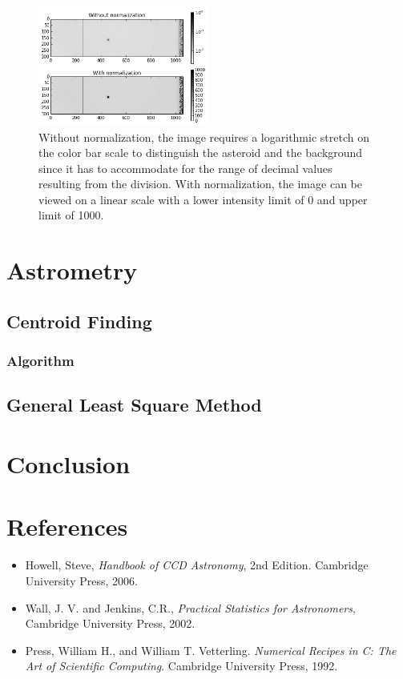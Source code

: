 \documentclass[authoryear, 12pt,5p, times]{elsarticle}
\begin{document}
	\begin{figure}[h!]
\includegraphics[width=0.5\textwidth]{figures/normalization}
\caption{Without normalization, the image requires a logarithmic stretch on the color bar scale to distinguish the asteroid and the background since it has to accommodate for the range of decimal values resulting from the division. With normalization, the image can be viewed on a linear scale with a lower intensity limit of 0 and upper limit of 1000.}
\label{normalization}
\end{figure}

	
\section{Astrometry}
	\subsection{Centroid Finding}
		\subsubsection{Algorithm}
	\subsection{General Least Square Method}

\section{Conclusion}

 \section{References}
%
\begin{itemize}
\item Howell, Steve,  \textit{Handbook of CCD Astronomy}, 2nd Edition. Cambridge University Press, 2006.
\item Wall, J. V. and Jenkins, C.R., \textit{Practical Statistics for Astronomers}, Cambridge University Press, 2002.
\item Press, William H., and William T. Vetterling. \textit{Numerical Recipes in C: The Art of Scientific Computing}. Cambridge University Press, 1992. 
\end{itemize}
\end{document}
